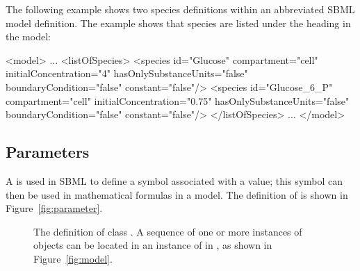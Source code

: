 The following example shows two species definitions within an
abbreviated SBML model definition.  The example shows that species
are listed under the heading  in the model:

\begin{example}
<model>
    ...
    <listOfSpecies>
        <species id="Glucose" compartment="cell" initialConcentration="4"
                 hasOnlySubstanceUnits="false" boundaryCondition="false" 
                 constant="false"/>
        <species id="Glucose_6_P" compartment="cell" initialConcentration="0.75"
                 hasOnlySubstanceUnits="false" boundaryCondition="false" 
                 constant="false"/>
    </listOfSpecies>
    ...
</model>
\end{example}


\subsection{Parameters}
\label{sec:parameters}

A \Parameter is used in SBML to define a symbol associated with a
value; this symbol can then be used in mathematical formulas in a
model. The definition of
\Parameter is shown in Figure~\vref{fig:parameter}.

\begin{figure}[htb]
  \centering
  \small
  \vspace{1ex}
  \caption{The definition of class \Parameter.  A
      sequence of one or more instances of \Parameter objects can
      be located in an instance of \ListOfParameters in \Model, as
      shown in Figure~\protect\ref{fig:model}.}
  \label{fig:parameter}
\end{figure}

